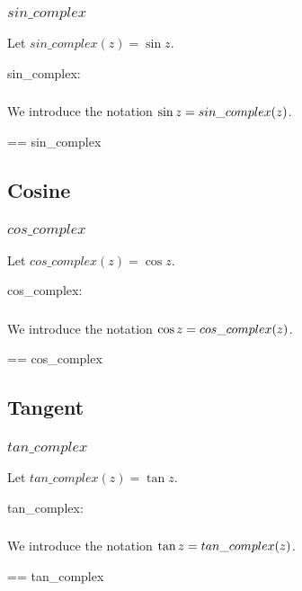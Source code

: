 \documentclass{amsart}
\begin{document}
\subsubsection{$sin\_complex$}

Let $sin\_complex(z) = \sin z$.

\begin{axdef}
	sin\_complex: \C \fun \C
\end{axdef}

\subsubsection{}

We introduce the notation $\operatorname{sin} z = sin\_complex(z)$.

\begin{zed}
	\sinC == sin\_complex
\end{zed}

\subsection{Cosine}

\subsubsection{$cos\_complex$}

Let $cos\_complex(z) = \cos z$.

\begin{axdef}
	cos\_complex: \C \fun \C
\end{axdef}

\subsubsection{}

We introduce the notation $\operatorname{cos} z = cos\_complex(z)$.

\begin{zed}
	\cosC == cos\_complex
\end{zed}

\subsection{Tangent}

\subsubsection{$tan\_complex$}

Let $tan\_complex(z) = \tan z$.

\begin{axdef}
	tan\_complex: \C \pfun \C
\end{axdef}

\subsubsection{}

We introduce the notation $\operatorname{tan} z = tan\_complex(z)$.

\begin{zed}
	\tanC == tan\_complex
\end{zed}

\printbibliography
\end{document}
